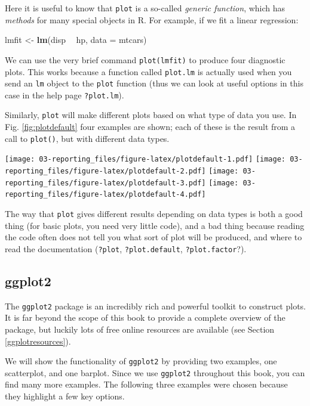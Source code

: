 \documentclass[]{book}
\newenvironment{Shaded}{\begin{snugshade}}{\end{snugshade}}
\newcommand{\DataTypeTok}[1]{\textcolor[rgb]{0.13,0.29,0.53}{#1}}
\newcommand{\KeywordTok}[1]{\textcolor[rgb]{0.13,0.29,0.53}{\textbf{#1}}}
\newcommand{\NormalTok}[1]{#1}
\newcommand{\OperatorTok}[1]{\textcolor[rgb]{0.81,0.36,0.00}{\textbf{#1}}}
\newcommand{\StringTok}[1]{\textcolor[rgb]{0.31,0.60,0.02}{#1}}
\begin{document}
Here it is useful to know that \texttt{plot} is a so-called \emph{generic function}, which has \emph{methods} for many special objects in R. For example, if we fit a linear regression:

\begin{Shaded}
\begin{Highlighting}[]
\NormalTok{lmfit <-}\StringTok{ }\KeywordTok{lm}\NormalTok{(disp }\OperatorTok{~}\StringTok{ }\NormalTok{hp, }\DataTypeTok{data =}\NormalTok{ mtcars)}
\end{Highlighting}
\end{Shaded}

We can use the very brief command \texttt{plot(lmfit)} to produce four diagnostic plots. This works because a function called \texttt{plot.lm} is actually used when you send an \texttt{lm} object to the \texttt{plot} function (thus we can look at useful options in this case in the help page \texttt{?plot.lm}).

Similarly, \texttt{plot} will make different plots based on what type of data you use. In Fig. \ref{fig:plotdefault} four examples are shown; each of these is the result from a call to \texttt{plot()}, but with different data types.

\texttt{[image: 03-reporting\_files/figure-latex/plotdefault-1.pdf]} \texttt{[image: 03-reporting\_files/figure-latex/plotdefault-2.pdf]} \texttt{[image: 03-reporting\_files/figure-latex/plotdefault-3.pdf]} \texttt{[image: 03-reporting\_files/figure-latex/plotdefault-4.pdf]}

The way that \texttt{plot} gives different results depending on data types is both a good thing (for basic plots, you need very little code), and a bad thing because reading the code often does not tell you what sort of plot will be produced, and where to read the documentation (\texttt{?plot}, \texttt{?plot.default}, \texttt{?plot.factor}?).

\hypertarget{ggplot2}{%
\subsection{ggplot2}\label{ggplot2}}

The \texttt{ggplot2} package is an incredibly rich and powerful toolkit to construct plots. It is far beyond the scope of this book to provide a complete overview of the package, but luckily lots of free online resources are available (see Section \ref{ggplotresources}).

We will show the functionality of \texttt{ggplot2} by providing two examples, one scatterplot, and one barplot. Since we use \texttt{ggplot2} throughout this book, you can find many more examples. The following three examples were chosen because they highlight a few key options.
\end{document}
